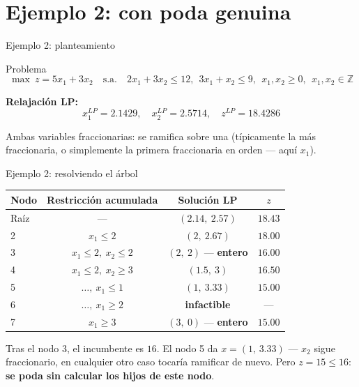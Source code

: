 \documentclass[aspectratio=169]{beamer}
\begin{document}
\section{Ejemplo 2: con poda genuina}

\begin{frame}{Ejemplo 2: planteamiento}
\begin{block}{Problema}
\[
\max\ z=5x_1+3x_2 \quad\text{s.a.}\quad 2x_1+3x_2\leq12,\ \ 3x_1+x_2\leq9,\ \ x_1,x_2\geq0,\ \ x_1,x_2\in\mathbb{Z}
\]
\end{block}

\textbf{Relajación LP:}
\[
x_1^{LP}=2.1429,\quad x_2^{LP}=2.5714,\quad z^{LP}=18.4286
\]

Ambas variables fraccionarias: se ramifica sobre una (típicamente la más fraccionaria, o simplemente la primera fraccionaria en orden --- aquí $x_1$).
\end{frame}

\begin{frame}{Ejemplo 2: resolviendo el árbol}
\vspace{-0.15cm}
\begin{center}
\small
\renewcommand{\arraystretch}{1.15}
\begin{tabular}{@{}lccc@{}}
\toprule
\textbf{Nodo} & \textbf{Restricción acumulada} & \textbf{Solución LP} & $z$\\
\midrule
Raíz & --- & $(2.14,\ 2.57)$ & $18.43$\\
2 & $x_1\leq2$ & $(2,\ 2.67)$ & $18.00$\\
3 & $x_1\leq2,\ x_2\leq2$ & $(2,\ 2)$ --- \textbf{entero} & $16.00$\\
4 & $x_1\leq2,\ x_2\geq3$ & $(1.5,\ 3)$ & $16.50$\\
5 & $\ldots,\ x_1\leq1$ & $(1,\ 3.33)$ & $\mathbf{15.00}$\\
6 & $\ldots,\ x_1\geq2$ & \textbf{infactible} & ---\\
7 & $x_1\geq3$ & $(3,\ 0)$ --- \textbf{entero} & $15.00$\\
\bottomrule
\end{tabular}
\end{center}
\normalsize

\small Tras el nodo 3, el incumbente es $16$. El nodo 5 da $x=(1,\,3.33)$ --- $x_2$ sigue fraccionario, en cualquier otro caso tocaría ramificar de nuevo. Pero $z=15\leq16$: \textbf{se poda sin calcular los hijos de este nodo}.
\end{frame}
\end{document}
